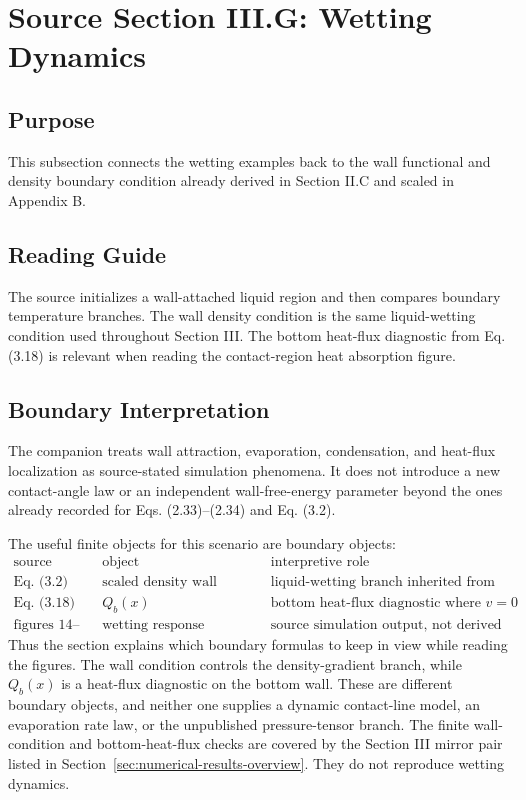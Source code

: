 \section{Source Section III.G: Wetting Dynamics}
\label{sec:wetting-dynamics}


\subsection*{Purpose}

This subsection connects the wetting examples back to the wall functional and
density boundary condition already derived in Section II.C and scaled in
Appendix B.

\subsection*{Reading Guide}

The source initializes a wall-attached liquid region and then compares boundary
temperature branches.  The wall density condition is the same liquid-wetting
condition used throughout Section III.  The bottom heat-flux diagnostic from
Eq. (3.18) is relevant when reading the contact-region heat absorption figure.

\subsection*{Boundary Interpretation}

The companion treats wall attraction, evaporation, condensation, and heat-flux
localization as source-stated simulation phenomena.  It does not introduce a
new contact-angle law or an independent wall-free-energy parameter beyond the
ones already recorded for Eqs. (2.33)--(2.34) and Eq. (3.2).

The useful finite objects for this scenario are boundary objects:
\[
\begin{array}{c|c|c}
\text{source anchor} & \text{object} & \text{interpretive role} \\
\hline
\text{Eq. (3.2)} & \text{scaled density wall condition}
  & \text{liquid-wetting branch inherited from II.C} \\
\text{Eq. (3.18)} & Q_b(x)
  & \text{bottom heat-flux diagnostic where }v=0 \\
\text{figures 14--15} & \text{wetting response}
  & \text{source simulation output, not derived here}
\end{array}
\]
Thus the section explains which boundary formulas to keep in view while reading
the figures.  The wall condition controls the density-gradient branch, while
\(Q_b(x)\) is a heat-flux diagnostic on the bottom wall.  These are different
boundary objects, and neither one supplies a dynamic contact-line model, an
evaporation rate law, or the unpublished pressure-tensor branch.
The finite wall-condition and bottom-heat-flux checks are covered by the
Section III mirror pair listed in Section~\ref{sec:numerical-results-overview}.
They do not reproduce wetting dynamics.


